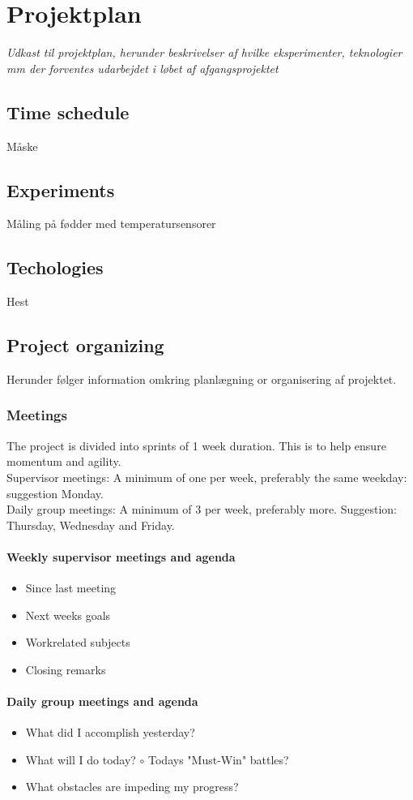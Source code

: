 \chapter{Projektplan}
\textit{Udkast til projektplan, herunder beskrivelser af hvilke eksperimenter, teknologier mm der forventes udarbejdet i løbet af afgangsprojektet}\\

\section{Time schedule}
Måske

\section{Experiments}
Måling på fødder med temperatursensorer

\section{Techologies}
Hest

\section{Project organizing}
Herunder følger information omkring planlægning or organisering af projektet.
\subsection{Meetings}
The project is divided into sprints of 1 week duration. This is to help ensure momentum and agility.\\
Supervisor meetings: A minimum of one per week, preferably the same weekday: suggestion Monday.\\
Daily group meetings: A minimum of 3 per week, preferably more. Suggestion: Thursday, Wednesday and Friday.
\subsubsection{Weekly supervisor meetings and agenda}
\begin{itemize}
\item Since last meeting
\item Next weeks goals
\item Workrelated subjects
\item Closing remarks
\end{itemize}
\subsubsection{Daily group meetings and agenda}
\begin{itemize}
\item What did I accomplish yesterday?
\item What will I do today?
\subitem $\circ$ Todays "Must-Win" battles?
\item What obstacles are impeding my progress?
\end{itemize}
